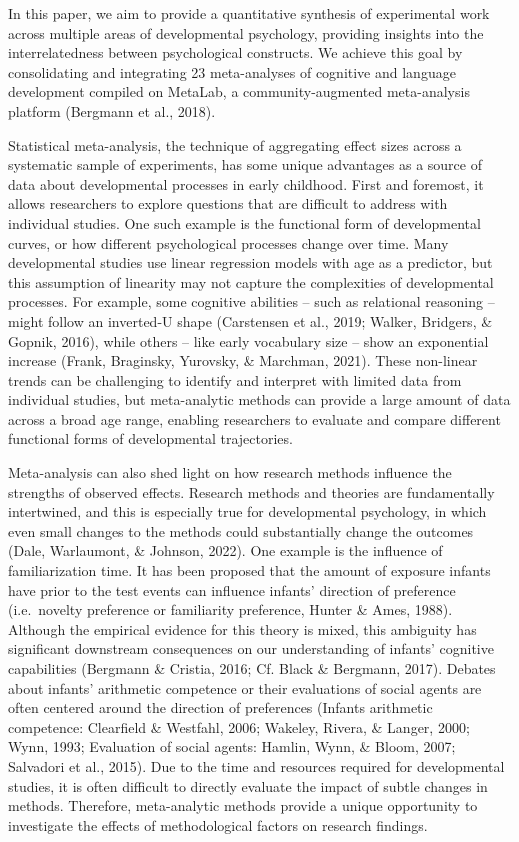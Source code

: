 \documentclass[10pt, letterpaper]{article}
\begin{document}
In this paper, we aim to provide a quantitative synthesis of
experimental work across multiple areas of developmental psychology,
providing insights into the interrelatedness between psychological
constructs. We achieve this goal by consolidating and integrating 23
meta-analyses of cognitive and language development compiled on MetaLab,
a community-augmented meta-analysis platform (Bergmann et al., 2018).

Statistical meta-analysis, the technique of aggregating effect sizes
across a systematic sample of experiments, has some unique advantages as
a source of data about developmental processes in early childhood. First
and foremost, it allows researchers to explore questions that are
difficult to address with individual studies. One such example is the
functional form of developmental curves, or how different psychological
processes change over time. Many developmental studies use linear
regression models with age as a predictor, but this assumption of
linearity may not capture the complexities of developmental processes.
For example, some cognitive abilities -- such as relational reasoning --
might follow an inverted-U shape (Carstensen et al., 2019; Walker,
Bridgers, \& Gopnik, 2016), while others -- like early vocabulary size
-- show an exponential increase (Frank, Braginsky, Yurovsky, \&
Marchman, 2021). These non-linear trends can be challenging to identify
and interpret with limited data from individual studies, but
meta-analytic methods can provide a large amount of data across a broad
age range, enabling researchers to evaluate and compare different
functional forms of developmental trajectories.

Meta-analysis can also shed light on how research methods influence the
strengths of observed effects. Research methods and theories are
fundamentally intertwined, and this is especially true for developmental
psychology, in which even small changes to the methods could
substantially change the outcomes (Dale, Warlaumont, \& Johnson, 2022).
One example is the influence of familiarization time. It has been
proposed that the amount of exposure infants have prior to the test
events can influence infants' direction of preference (i.e.~novelty
preference or familiarity preference, Hunter \& Ames, 1988). Although
the empirical evidence for this theory is mixed, this ambiguity has
significant downstream consequences on our understanding of infants'
cognitive capabilities (Bergmann \& Cristia, 2016; Cf. Black \&
Bergmann, 2017). Debates about infants' arithmetic competence or their
evaluations of social agents are often centered around the direction of
preferences (Infants arithmetic competence: Clearfield \& Westfahl,
2006; Wakeley, Rivera, \& Langer, 2000; Wynn, 1993; Evaluation of social
agents: Hamlin, Wynn, \& Bloom, 2007; Salvadori et al., 2015). Due to
the time and resources required for developmental studies, it is often
difficult to directly evaluate the impact of subtle changes in methods.
Therefore, meta-analytic methods provide a unique opportunity to
investigate the effects of methodological factors on research findings.
\end{document}
